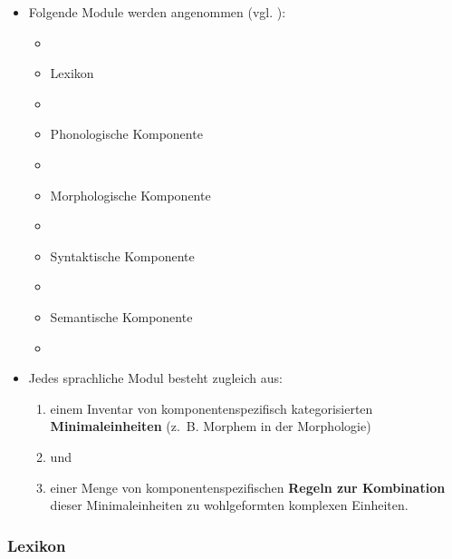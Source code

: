\begin{frame}

\begin{itemize}
	\item Folgende Module werden angenommen (vgl. \citet{Abramowski2016a}):
		
	\begin{itemize}
		\item[]
		\item Lexikon
		\item[]
		\item Phonologische Komponente
		\item[]
		\item Morphologische Komponente
		\item[]
		\item Syntaktische Komponente
		\item[]
		\item Semantische Komponente
		\item[]
	\end{itemize}
		
	\item<2-> Jedes sprachliche Modul besteht zugleich aus:
	
	\begin{enumerate}
		\item<2-> einem Inventar von komponentenspezifisch kategorisierten \textbf{Minimaleinheiten} (z.~B. Morphem in der Morphologie)
		\item<2->[] und
		\item<2-> einer Menge von komponentenspezifischen \textbf{Regeln zur Kombination} dieser Minimaleinheiten zu wohlgeformten komplexen Einheiten. 
	\end{enumerate}		  
		
\end{itemize}

\end{frame}


%
\subsubsection{Lexikon}
%


